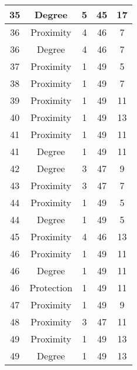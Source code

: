 \documentclass[results.tex]{subfiles}
\begin{document}
\begin{center}
\begin{tabular}{| c || c | c | c | c |}
    \hline
    35 & Degree & 5 & 45 & 17 \\ 
    \hline
    36 & Proximity & 4 & 46 & 7 \\ 
    \hline
    36 & Degree & 4 & 46 & 7 \\ 
    \hline
    37 & Proximity & 1 & 49 & 5 \\ 
    \hline
    38 & Proximity & 1 & 49 & 7 \\ 
    \hline
    39 & Proximity & 1 & 49 & 11 \\ 
    \hline
    40 & Proximity & 1 & 49 & 13 \\ 
    \hline
    41 & Proximity & 1 & 49 & 11 \\ 
    \hline
    41 & Degree & 1 & 49 & 11 \\ 
    \hline
    42 & Degree & 3 & 47 & 9 \\ 
    \hline
    43 & Proximity & 3 & 47 & 7 \\ 
    \hline
    44 & Proximity & 1 & 49 & 5 \\ 
    \hline
    44 & Degree & 1 & 49 & 5 \\ 
    \hline
    45 & Proximity & 4 & 46 & 13 \\ 
    \hline
    46 & Proximity & 1 & 49 & 11 \\ 
    \hline
    46 & Degree & 1 & 49 & 11 \\ 
    \hline
    46 & Protection & 1 & 49 & 11 \\ 
    \hline
    47 & Proximity & 1 & 49 & 9 \\ 
    \hline
    48 & Proximity & 3 & 47 & 11 \\ 
    \hline
    49 & Proximity & 1 & 49 & 13 \\ 
    \hline
    49 & Degree & 1 & 49 & 13 \\ 
    \hline   \end{tabular}
\end{center}
\end{document}
